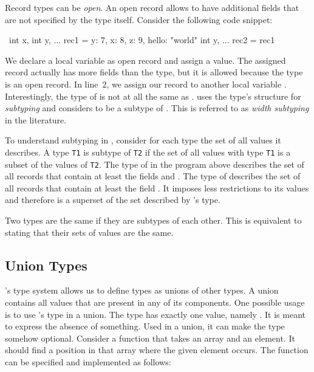 Record types can be \emph{open}.
An open record allows to have additional fields that are not specified by the type itself.
Consider the following code snippet:

\begin{whileycode}\
{int x, int y, ...} rec1 = {y: 7, x: 8, z: 9, hello: "world"}
{int y, ...} rec2 = rec1
\end{whileycode}

We declare a local variable  as open record and assign a value.
The assigned record actually has more fields than the type, but it is allowed because the type is an open record.
In line~2, we assign our record to another local variable .
Interestingly, the type of \whileyinline{rec2} is not at all the same as .
\whiley uses the type's structure for \emph{subtyping} and considers  to be a subtype of .
This is referred to as \emph{width subtyping} in the literature.

To understand subtyping in \whiley, consider for each type the set of all values it describes.
A type \texttt{T1} is subtype of \texttt{T2} if the set of all values with type \texttt{T1} is a subset of the values of \texttt{T2}.
The type of \whileyinline{rec1} in the program above describes the set of all records that contain at least the fields  and .
The type of \whileyinline{rec2} describes the set of all records that contain at least the field \whileyinline{int y}.
It imposes less restrictions to its values and therefore is a superset of the set described by \whileyinline{rec1}'s type.

Two types are the same if they are subtypes of each other.
This is equivalent to stating that their sets of values are the same.


\subsection{Union Types}

\whiley's type system allows us to define types as unions of other types.
A union contains all values that are present in any of its components.
One possible usage is to use \whiley's  type in a union.
The type  has exactly one value, namely \whileyinline{null}.
It is meant to express the absence of something.
Used in a union, it can make the type somehow optional.
Consider a function that takes an array and an element.
It should find a position in that array where the given element occurs.
The function can be specified and implemented as follows:

